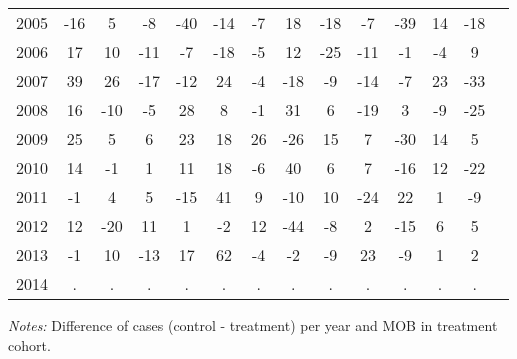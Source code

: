 \begin{table}[H]
\begin{threeparttable}
{\begin{tabular}{l*{13}{c}}
2005        &         -16&           5&          -8&         -40&         -14&          -7&          18&         -18&          -7&         -39&          14&         -18\\
2006        &          17&          10&         -11&          -7&         -18&          -5&          12&         -25&         -11&          -1&          -4&           9\\
2007        &          39&          26&         -17&         -12&          24&          -4&         -18&          -9&         -14&          -7&          23&         -33\\
2008        &          16&         -10&          -5&          28&           8&          -1&          31&           6&         -19&           3&          -9&         -25\\
2009        &          25&           5&           6&          23&          18&          26&         -26&          15&           7&         -30&          14&           5\\
2010        &          14&          -1&           1&          11&          18&          -6&          40&           6&           7&         -16&          12&         -22\\
2011        &          -1&           4&           5&         -15&          41&           9&         -10&          10&         -24&          22&           1&          -9\\
2012        &          12&         -20&          11&           1&          -2&          12&         -44&          -8&           2&         -15&           6&           5\\
2013        &          -1&          10&         -13&          17&          62&          -4&          -2&          -9&          23&          -9&           1&           2\\
2014        &           .&           .&           .&           .&           .&           .&           .&           .&           .&           .&           .&           .\\
 \bottomrule \end{tabular} } \begin{tablenotes} \item \scriptsize \emph{Notes:} Difference of cases (control - treatment) per year and MOB in treatment cohort. \end{tablenotes} \end{threeparttable} \end{table} 
